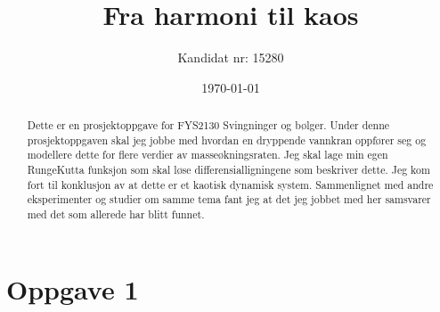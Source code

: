 \documentclass[norsk,a4paper,12pt]{article}
\title{Fra harmoni til kaos}
\author{Kandidat nr: 15280}
\date{\today}
\begin{document}
\renewcommand{\abstractname}{\large Sammendrag}
\renewcommand{\contentsname}{\LARGE Innhold}
\renewcommand{\listfigurename}{\Large Figur liste}
\renewcommand{\listtablename}{\Large Tabell liste}
\renewcommand\appendixpagename{Appendix}
\renewcommand\appendixtocname{Appendix}

\maketitle
\newpage
\tableofcontents
\newpage
\listoffigures
\newpage





\begin{abstract}
Dette er en prosjektoppgave for FYS2130 Svingninger og bølger. Under denne prosjektoppgaven skal jeg jobbe med hvordan en dryppende vannkran oppfører seg og modellere dette for flere verdier av masseøkningsraten. Jeg skal lage min egen RungeKutta funksjon som skal løse differensialligningene som beskriver dette. Jeg kom fort til konklusjon av at dette er et kaotisk dynamisk system. Sammenlignet med andre eksperimenter og studier om samme tema fant jeg at det jeg jobbet med her samsvarer med det som allerede har blitt funnet. 
\end{abstract}

\section{Oppgave 1}
\end{document}
